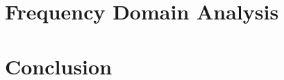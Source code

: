 

\section{Frequency Domain Analysis}
\label{sec:approx_frequency_domain_analysis}



\section{Conclusion}
\label{sec:approx_conclusion}
